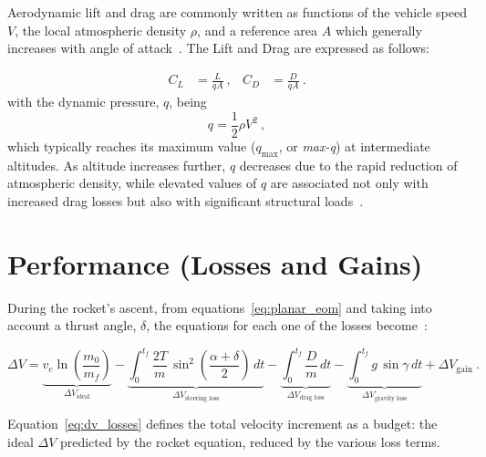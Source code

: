 Aerodynamic lift and drag are commonly written as functions of the vehicle speed $V$, the local atmospheric density $\rho$, and a reference area $A$ which generally increases with angle of attack~\cite{Turner}. The Lift and Drag are expressed as follows:

\begin{equation}
\begin{aligned}
C_L &=\frac{L}{qA} \ , &
C_D &=\frac{D}{qA} \ .
\end{aligned}
\label{eq:cd}
\end{equation}
with the dynamic pressure, $q$, being
\begin{equation}
q = \frac{1}{2}\rho V^2 \ ,
\label{eq:q_dyn_press}
\end{equation}
which typically reaches its maximum value ($q_{\max}$, or \emph{max-q}) at intermediate altitudes. As altitude increases further, $q$ decreases due to the rapid reduction of atmospheric density, while elevated values of $q$ are associated not only with increased drag losses but also with significant structural loads~\cite{Ulrich}.


\section{Performance (Losses and Gains)}

During the rocket's ascent, from equations~\ref{eq:planar_eom} and taking into account a thrust angle, $\delta$, the equations for each one of the losses become~\cite{Edberg}:

\begin{equation}
\label{eq:dv_losses}
\Delta V
=
\underbrace{v_e \ln\!\left(\frac{m_0}{m_f}\right)}_{\Delta V_{\text{ideal}}}
-
\underbrace{\int_{0}^{t_f}\frac{2T}{m}\,\sin^2\!\left(\frac{\alpha+\delta}{2}\right)\,dt}_{\Delta V_{\text{steering loss}}}
-
\underbrace{\int_{0}^{t_f}\frac{D}{m}\,dt}_{\Delta V_{\text{drag loss}}}
-
\underbrace{\int_{0}^{t_f} g\,\sin\gamma\,dt}_{\Delta V_{\text{gravity loss}}}
+
\Delta V_{\text{gain}} \ .
\end{equation}

Equation~\eqref{eq:dv_losses} defines the total velocity increment as a budget: the ideal $\Delta V$ predicted by the rocket equation, reduced by the various loss terms.


